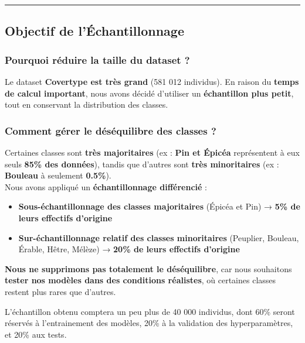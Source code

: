 \documentclass[
]{article}
\providecommand{\tightlist}{%
  \setlength{\itemsep}{0pt}\setlength{\parskip}{0pt}}\usepackage{longtable,booktabs,array}
\begin{document}
\begin{center}\rule{0.5\linewidth}{0.5pt}\end{center}

\subsection{Objectif de
l'Échantillonnage}\label{objectif-de-luxe9chantillonnage}

\subsubsection{Pourquoi réduire la taille du dataset
?}\label{pourquoi-ruxe9duire-la-taille-du-dataset}

Le dataset \textbf{Covertype est très grand} (581 012 individus). En
raison du \textbf{temps de calcul important}, nous avons décidé
d'utiliser un \textbf{échantillon plus petit}, tout en conservant la
distribution des classes.

\subsubsection{Comment gérer le déséquilibre des classes
?}\label{comment-guxe9rer-le-duxe9suxe9quilibre-des-classes}

Certaines classes sont \textbf{très majoritaires} (ex : \textbf{Pin et
Épicéa} représentent à eux seuls \textbf{85\% des données}), tandis que
d'autres sont \textbf{très minoritaires} (ex : \textbf{Bouleau} à
seulement \textbf{0.5\%}).\\
Nous avons appliqué un \textbf{échantillonnage différencié} :

\begin{itemize}
\tightlist
\item
  \textbf{Sous-échantillonnage des classes majoritaires} (Épicéa et Pin)
  → \textbf{5\% de leurs effectifs d'origine}
\item
  \textbf{Sur-échantillonnage relatif des classes minoritaires}
  (Peuplier, Bouleau, Érable, Hêtre, Mélèze) → \textbf{20\% de leurs
  effectifs d'origine}
\end{itemize}

\textbf{Nous ne supprimons pas totalement le déséquilibre}, car nous
souhaitons \textbf{tester nos modèles dans des conditions réalistes}, où
certaines classes restent plus rares que d'autres.

L'échantillon obtenu comptera un peu plus de 40 000 individus, dont 60\%
seront réservés à l'entrainement des modèles, 20\% à la validation des
hyperparamètres, et 20\% aux tests.
\end{document}
